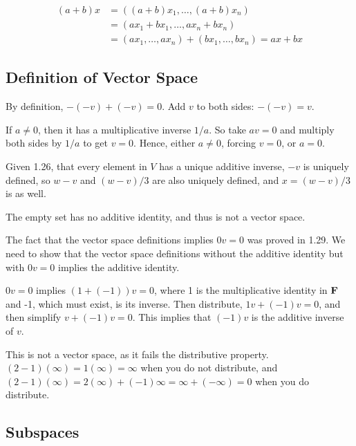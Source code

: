 \documentclass{article}
\begin{document}

\begin{align*}
(a+b)x & = ((a+b)x_1, \ldots, (a+b)x_n) \\
       & = (ax_1 + bx_1, \ldots, ax_n + bx_n) \\
       & = (ax_1, \ldots, ax_n) + (bx_1, \ldots, bx_n) = ax + bx
\end{align*}

\subsection{Definition of Vector Space}


By definition, $-(-v) + (-v) = 0$. Add $v$ to both sides: $-(-v) = v$.


If $a \neq 0$, then it has a multiplicative inverse $1/a$. So take $av = 0$
and multiply both sides by $1/a$ to get $v = 0$. Hence, either $a \neq 0$,
forcing $v = 0$, or $a = 0$.


Given 1.26, that every element in $V$ has a unique additive inverse, $-v$ is
uniquely defined, so $w - v$ and $(w - v)/3$ are also uniquely defined, and $x =
(w - v)/3$ is as well.


The empty set has no additive identity, and thus is not a vector space.


The fact that the vector space definitions implies $0v = 0$ was proved in 1.29.
We need to show that the vector space definitions without the additive identity
but with $0v = 0$ implies the additive identity.

$0v = 0$ implies $(1 + (-1))v = 0$, where 1 is the multiplicative identity in
$\mathbf{F}$ and -1, which must exist, is its inverse. Then distribute, $1v + (-1)v =
0$, and then simplify $v + (-1)v = 0$. This implies that $(-1)v$ is the additive
inverse of $v$.


This is not a vector space, as it fails the distributive property. $(2 -
1)(\infty) = 1(\infty) = \infty$ when you do not distribute, and $(2 -
1)(\infty) = 2(\infty) + (-1)\infty = \infty + (-\infty) = 0$ when you do
distribute.

\subsection{Subspaces}
\end{document}

